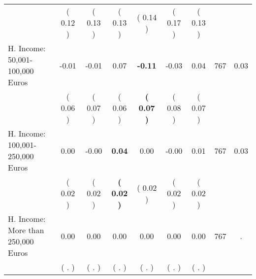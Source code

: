 \begin{tabular}{lcccccccc}
 & (     0.12 ) & (     0.13 ) & (     0.13 ) & (     0.14 ) & (     0.17 ) & (     0.13 ) & \\
H. Income: 50,001-100,000 Euros &     -0.01 &     -0.01 &      0.07 & \textbf{    -0.11} &     -0.03 &      0.04 & 767 &       0.03 \\ 
 & (     0.06 ) & (     0.07 ) & (     0.06 ) & \textbf{(     0.07 )} & (     0.08 ) & (     0.07 ) & \\
H. Income: 100,001-250,000 Euros &      0.00 &     -0.00 & \textbf{     0.04} &      0.00 &     -0.00 &      0.01 & 767 &       0.03 \\ 
 & (     0.02 ) & (     0.02 ) & \textbf{(     0.02 )} & (     0.02 ) & (     0.02 ) & (     0.02 ) & \\
H. Income: More than 250,000 Euros &      0.00 &      0.00 &      0.00 &      0.00 &      0.00 &      0.00 & 767 &          . \\ 
 & (        . ) & (        . ) & (        . ) & (        . ) & (        . ) & (        . ) & \\
\bottomrule
\end{tabular}
